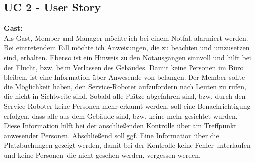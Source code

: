 
\subsection*{UC 2 - User Story}
\textbf{Gast:}
\\
    Als Gast, Member und Manager möchte ich bei einem Notfall alarmiert werden. Bei eintretendem Fall möchte ich 
    Anweisungen, die zu beachten und umzusetzen sind, erhalten. Ebenso ist ein Hinweis zu den Notausgängen 
    sinnvoll und hilft bei der Flucht, bzw. beim Verlassen des Gebäudes. Damit keine Personen im Büro 
    bleiben, ist eine Information über Anwesende von belangen. Der Member sollte die Möglichkeit haben, den 
    Service-Roboter aufzufordern nach Leuten zu rufen, die nicht in Sichtweite sind. Sobald alle Plätze 
    abgefahren sind, bzw. durch den Service-Roboter keine Personen mehr erkannt werden, soll eine Benachrichtigung 
    erfolgen, dass alle aus dem Gebäude sind, bzw. keine mehr gesichtet wurden. Diese Information hilft bei der 
    anschließenden Kontrolle über am Treffpunkt anwesender Personen. Abschließend soll ggf. Eine Information über die 
    Platzbuchungen gezeigt werden, damit bei der Kontrolle keine Fehler unterlaufen und keine Personen, die nicht 
    gesehen werden, vergessen werden.

